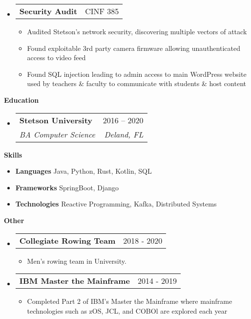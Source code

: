 \documentclass[letterpaper,12pt]{article}[leftmargin=*]
\makeatletter
\def \entryspacing {-0pt}
\renewcommand{\section}[2]{\vspace{5pt}
  \colorbox{secondary}{\color{white}\raggedbottom\normalsize\textbf{{#1}{\hspace{7pt}#2}}}
}
\newcommand{\resumeEntryStart}{\begin{itemize}[leftmargin=2.5mm]}
\newcommand{\resumeEntryEnd}{\end{itemize}\vspace{\entryspacing}}
\newcommand{\resumeItemListStart}{\begin{itemize}[leftmargin=4.5mm]}
\newcommand{\resumeItemListEnd}{\end{itemize}}
\newcommand{\resumeItem}[1]{
  \item\small{
    {#1 \vspace{-2pt}}
  }
}
\newcommand{\resumeEntryTSDL}[4]{
  \vspace{-1pt}\item[]
    \begin{tabularx}{0.97\textwidth}{X@{\hspace{60pt}}r}
      \textbf{\color{primary}#1} & {\firabook\color{accent}\small#2} \\
      \textit{\color{accent}\small#3} & \textit{\color{accent}\small#4} \\
    \end{tabularx}\vspace{-6pt}
}
\newcommand{\resumeEntryTD}[2]{
  \vspace{-1pt}\item[]
    \begin{tabularx}{0.97\textwidth}{X@{\hspace{60pt}}r}
      \textbf{\color{primary}#1} & {\firabook\color{accent}\small#2} \\
    \end{tabularx}\vspace{-6pt}
}
\newcommand{\resumeEntryS}[2]{
  \item[]\small{
    \textbf{\color{primary}#1 }{ #2 \vspace{-6pt}}
  }
}
\makeatother
\begin{document}
  \resumeEntryStart
    \resumeEntryTD
      {Security Audit}{CINF 385}
    \resumeItemListStart
    \resumeItem{Audited Stetson's network security, discovering multiple vectors of attack}
    \resumeItem{Found exploitable 3rd party camera firmware allowing unauthenticated access to video feed}
    \resumeItem{Found SQL injection leading to admin access to main WordPress website used by teachers \& faculty to communicate with students \& host content}
    \resumeItemListEnd
  \resumeEntryEnd


\section{\faGraduationCap}{Education}

  \resumeEntryStart
    \resumeEntryTSDL
      {Stetson University}{2016 -- 2020}
      {BA Computer Science}{Deland, FL}
  \resumeEntryEnd

\section{\faGears}{Skills}
 \resumeEntryStart
  \resumeEntryS{Languages} {Java, Python, Rust, Kotlin, SQL}
  \resumeEntryS{Frameworks} {SpringBoot, Django}
  \resumeEntryS{Technologies}{Reactive Programming, Kafka, Distributed Systems}
 \resumeEntryEnd
 
 \section{\faGears}{Other}
 \resumeEntryStart
    \resumeEntryTD
      {Collegiate Rowing Team}{2018 - 2020}
    \resumeItemListStart
      \resumeItem {Men's rowing team in University.}
    \resumeItemListEnd
  \resumeEntryEnd
   \resumeEntryStart
    \resumeEntryTD
      {IBM Master the Mainframe}{2014 - 2019}
    \resumeItemListStart
    \resumeItem {Completed Part 2 of IBM's Master the Mainframe where mainframe
    technologies such as zOS, JCL, and COBOl are explored each year}
    \resumeItemListEnd
  \resumeEntryEnd
\end{document}
